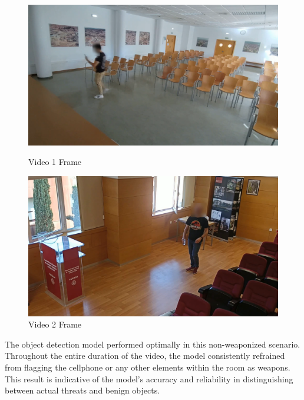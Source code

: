 \begin{figure}[h]
    \centering
    \begin{minipage}{0.44\textwidth}
        \centering
        \includegraphics[width=1\linewidth]{figs/non-weapon-frame2.png}
        \caption{Video 1 Frame}
        \label{fig:non-weapon-frames1}
    \end{minipage}\hfill
    \begin{minipage}{0.44\textwidth}
        \centering
        \includegraphics[width=1\linewidth]{figs/non-weapon-frame1.png}
        \caption{Video 2 Frame}
        \label{fig:non-weapon-frames2}
    \end{minipage}
\end{figure}

The object detection model performed optimally in this non-weaponized scenario. Throughout the entire duration of 
the video, the model consistently refrained from flagging the cellphone or any other elements within the room as 
weapons. This result is indicative of the model's accuracy and reliability in distinguishing between actual threats 
and benign objects.

